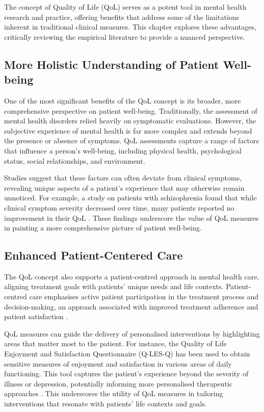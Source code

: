 \documentclass[10pt]{article}
\begin{document}
\begin{sloppypar}
  The concept of Quality of Life (QoL) serves as a potent tool in mental health research and practice, offering benefits that address some of the limitations inherent in traditional clinical measures. This chapter explores these advantages, critically reviewing the empirical literature to provide a nuanced perspective.

  \subsection{More Holistic Understanding of Patient Well-being}
  \label{subsec:holistic}
  One of the most significant benefits of the QoL concept is its broader, more comprehensive perspective on patient well-being. Traditionally, the assessment of mental health disorders relied heavily on symptomatic evaluations. However, the subjective experience of mental health is far more complex and extends beyond the presence or absence of symptoms. QoL assessments capture a range of factors that influence a person's well-being, including physical health, psychological status, social relationships, and environment.

  Studies suggest that these factors can often deviate from clinical symptoms, revealing unique aspects of a patient's experience that may otherwise remain unnoticed. For example, a study on patients with schizophrenia found that while clinical symptom severity decreased over time, many patients reported no improvement in their QoL \citep{eack_quality_2007}. These findings underscore the value of QoL measures in painting a more comprehensive picture of patient well-being.

  \subsection{Enhanced Patient-Centered Care}
  \label{subsec:patient-centered}
  The QoL concept also supports a patient-centred approach in mental health care, aligning treatment goals with patients' unique needs and life contexts. Patient-centred care emphasises active patient participation in the treatment process and decision-making, an approach associated with improved treatment adherence and patient satisfaction \citep{dwamena_interventions_2012}.

  QoL measures can guide the delivery of personalised interventions by highlighting areas that matter most to the patient. For instance, the Quality of Life Enjoyment and Satisfaction Questionnaire (Q-LES-Q) has been used to obtain sensitive measures of enjoyment and satisfaction in various areas of daily functioning. This tool captures the patient's experience beyond the severity of illness or depression, potentially informing more personalised therapeutic approaches \citep{endicott_quality_1993}. This underscores the utility of QoL measures in tailoring interventions that resonate with patients' life contexts and goals.


\end{sloppypar}
\end{document}
